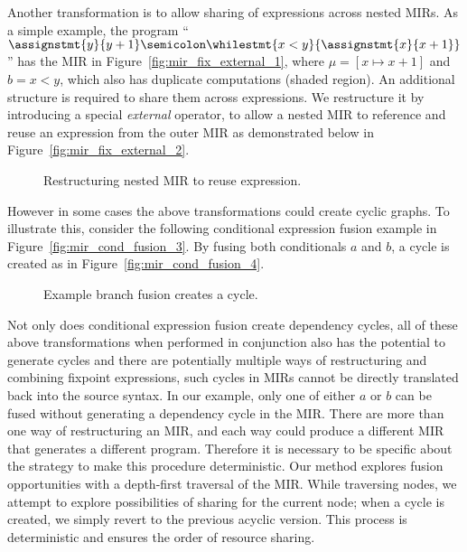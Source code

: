Another transformation is to allow sharing of expressions across nested
MIRs.  As a simple example, the program ``$\assignstmt{y}{y + 1}
\semicolon \whilestmt{x < y}{\assignstmt{x}{x + 1}}$'' has the MIR in
Figure~\ref{fig:mir_fix_external_1}, where $\mu = [x \mapsto x + 1]$ and $b =
x < y$, which also has duplicate computations (shaded region).  An additional
structure is required to share them across expressions.  We restructure it
by introducing a special \emph{external} operator, to allow a nested MIR to
reference and reuse an expression from the outer MIR as demonstrated below in
Figure~\ref{fig:mir_fix_external_2}.
\begin{figure}[ht]
    \centering
    \caption{Restructuring nested MIR to reuse expression.}
    \centering
\end{figure}

However in some cases the above transformations could create cyclic graphs.
To illustrate this, consider the following conditional expression fusion
example in Figure~\ref{fig:mir_cond_fusion_3}.  By fusing both conditionals
$a$ and $b$, a cycle is created as in Figure~\ref{fig:mir_cond_fusion_4}.
\begin{figure}[ht]
    \centering
    \quad
    \caption{Example branch fusion creates a cycle.}
\end{figure}

Not only does conditional expression fusion create dependency cycles, all
of these above transformations when performed in conjunction also has the
potential to generate cycles and there are potentially multiple ways of
restructuring and combining fixpoint expressions, such cycles in MIRs cannot
be directly translated back into the source syntax.  In our example, only
one of either $a$ or $b$ can be fused without generating a dependency cycle
in the MIR\@.  There are more than one way of restructuring an MIR, and
each way could produce a different MIR that generates a different program.
Therefore it is necessary to be specific about the strategy to make this
procedure deterministic.  Our method explores fusion opportunities with a
depth-first traversal of the MIR\@.  While traversing nodes, we attempt
to explore possibilities of sharing for the current node; when a cycle is
created, we simply revert to the previous acyclic version.  This process is
deterministic and ensures the order of resource sharing.


